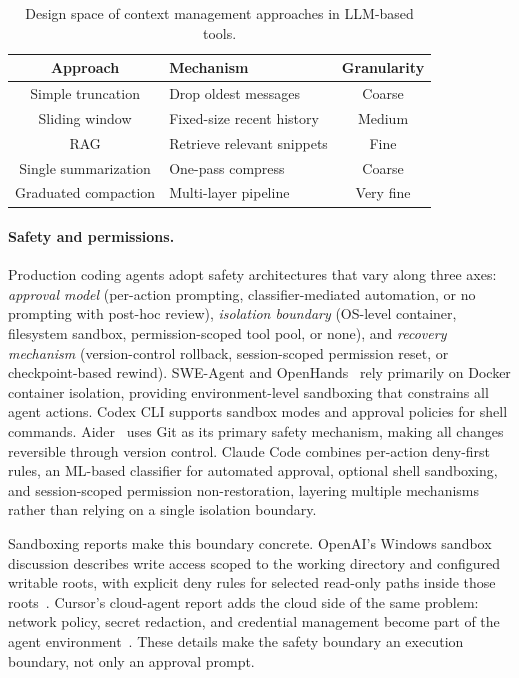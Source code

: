 \begin{table}[t]
\centering
\caption{Design space of context management approaches in LLM-based tools.}
\label{tab:context-comparison}
\small
\begin{tabularx}{\columnwidth}{>{\centering\arraybackslash}c >{\centering\arraybackslash}X >{\centering\arraybackslash}c}
\toprule
\textbf{Approach} & \textbf{Mechanism} & \textbf{Granularity} \\
\midrule
Simple truncation & Drop oldest messages & Coarse \\
Sliding window & Fixed-size recent history & Medium \\
RAG & Retrieve relevant snippets & Fine \\
Single summarization & One-pass compress & Coarse \\
Graduated compaction & Multi-layer pipeline & Very fine \\
\bottomrule
\end{tabularx}
\end{table}

\paragraph{Safety and permissions.}
Production coding agents adopt safety architectures that vary along three axes: \emph{approval model} (per-action prompting, classifier-mediated automation, or no prompting with post-hoc review), \emph{isolation boundary} (OS-level container, filesystem sandbox, permission-scoped tool pool, or none), and \emph{recovery mechanism} (version-control rollback, session-scoped permission reset, or checkpoint-based rewind). SWE-Agent and OpenHands~\citep{yang2024sweagent,wang2024openhands} rely primarily on Docker container isolation, providing environment-level sandboxing that constrains all agent actions. Codex CLI supports sandbox modes and approval policies for shell commands. Aider~\citep{gauthier2024aider} uses Git as its primary safety mechanism, making all changes reversible through version control. Claude Code combines per-action deny-first rules, an ML-based classifier for automated approval, optional shell sandboxing, and session-scoped permission non-restoration, layering multiple mechanisms rather than relying on a single isolation boundary.

Sandboxing reports make this boundary concrete. OpenAI's Windows sandbox discussion describes write access scoped to the working directory and configured writable roots, with explicit deny rules for selected read-only paths inside those roots~\citep{openai2026windowssandbox}. Cursor's cloud-agent report adds the cloud side of the same problem: network policy, secret redaction, and credential management become part of the agent environment~\citep{cursor2026cloudagents}. These details make the safety boundary an execution boundary, not only an approval prompt.

